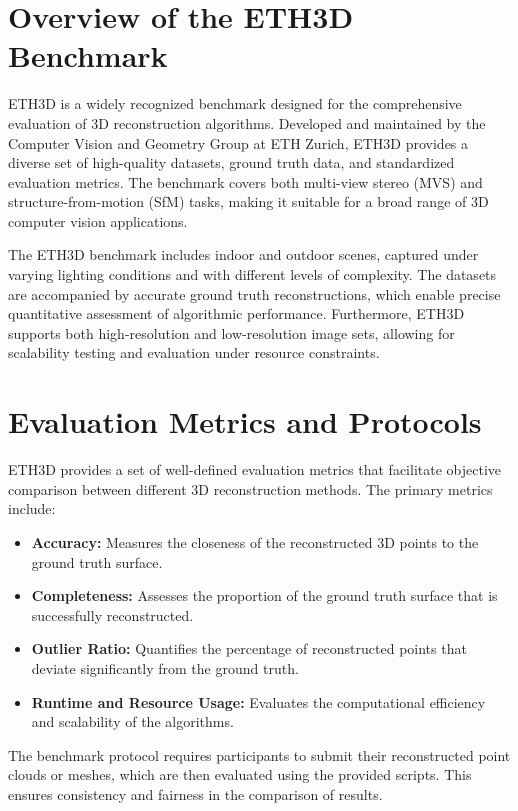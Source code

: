 \section{Overview of the ETH3D Benchmark}

ETH3D is a widely recognized benchmark designed for the comprehensive evaluation of 3D reconstruction algorithms. Developed and maintained by the Computer Vision and Geometry Group at ETH Zurich, ETH3D provides a diverse set of high-quality datasets, ground truth data, and standardized evaluation metrics. The benchmark covers both multi-view stereo (MVS) and structure-from-motion (SfM) tasks, making it suitable for a broad range of 3D computer vision applications.

The ETH3D benchmark includes indoor and outdoor scenes, captured under varying lighting conditions and with different levels of complexity. The datasets are accompanied by accurate ground truth reconstructions, which enable precise quantitative assessment of algorithmic performance. Furthermore, ETH3D supports both high-resolution and low-resolution image sets, allowing for scalability testing and evaluation under resource constraints.

\section{Evaluation Metrics and Protocols}

ETH3D provides a set of well-defined evaluation metrics that facilitate objective comparison between different 3D reconstruction methods. The primary metrics include:

\begin{itemize}
    \item \textbf{Accuracy:} Measures the closeness of the reconstructed 3D points to the ground truth surface.
    \item \textbf{Completeness:} Assesses the proportion of the ground truth surface that is successfully reconstructed.
    \item \textbf{Outlier Ratio:} Quantifies the percentage of reconstructed points that deviate significantly from the ground truth.
    \item \textbf{Runtime and Resource Usage:} Evaluates the computational efficiency and scalability of the algorithms.
\end{itemize}

The benchmark protocol requires participants to submit their reconstructed point clouds or meshes, which are then evaluated using the provided scripts. This ensures consistency and fairness in the comparison of results.

